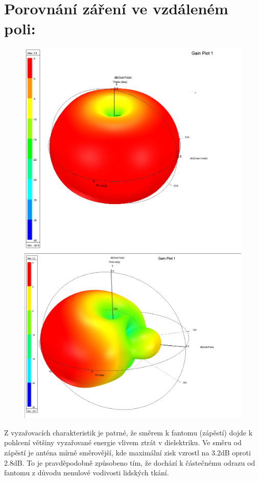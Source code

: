 \documentclass[10pt, a4paper]{article}%
\begin{document}
	\section{\Large Porovnání záření ve vzdáleném poli:}
	\begin{figure}[ht!]
		\centering
		\begin{minipage}{.5\textwidth}
		  \centering
		  \includegraphics[height = 0.3\textheight]{Far_field.png}
		\end{minipage}%
		\begin{minipage}{.5\textwidth}
		  \centering
		  \includegraphics[height = 0.3\textheight]{Far_field_phantom.png}
		\end{minipage}
		\end{figure}
Z vyzařovacích charakteristik je patrné, že směrem k fantomu (zápěstí) dojde k pohlcení
většiny vyzařované energie vlivem ztrát v dielektriku. Ve směru od zápěstí je anténa
mírně směrovější, kde maximální zisk vzrostl na 3.2dB oproti 2.8dB. To je pravděpodobně způsobeno
tím, že dochází k částečnému odrazu od fantomu z důvodu nenulové vodivosti lidských tkání.
\clearpage
\end{document}
